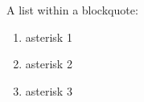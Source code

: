 \begin{displayquote}
  
  A list within a blockquote:
  \begin{enumerate}
    \item{asterisk 1}
    \item{asterisk 2}
    \item{asterisk 3}
  \end{enumerate}
\end{displayquote}